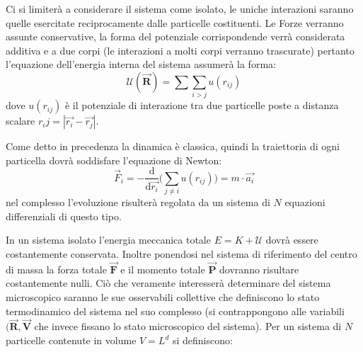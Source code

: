 \documentclass[11pt]{article}
\theoremstyle{plain}
\theoremstyle{remark}
\begin{document}
Ci si limiterà a considerare il sistema come isolato, le uniche interazioni saranno quelle esercitate reciprocamente dalle particelle costituenti. Le Forze verranno assunte conservative, la forma del potenziale corrispondende verrà considerata additiva e a due corpi (le interazioni a molti corpi verranno trascurate) pertanto l'equazione dell'energia interna del sistema assumerà la forma:
\begin{displaymath}
\mathcal{U}(\vec{\mathbf{R}}) = \sum\sum_{i>j}u(r_{ij})
\end{displaymath}
dove $u(r_{ij})$ è il potenziale di interazione tra due particelle poste a distanza scalare $r_ij = |\vec{r_i}-\vec{r_j}|$.


Come detto in precedenza la dinamica è classica, quindi la traiettoria di ogni particella dovrà soddisfare l'equazione di Newton:
\begin{displaymath}
\vec{F}_i = - \dfrac{\textrm{d}}{\textrm{d}\vec{r_i}} \Bigr(\sum_{j \neq i}u(r_{ij}) \Bigr) = m \cdot \vec{a_i}
\end{displaymath}
nel complesso l'evoluzione risulterà regolata da un sistema di $N$ equazioni differenziali di questo tipo.

In un sistema isolato l'energia meccanica totale $ E = K + \mathcal{U} $ dovrà essere costantemente conservata. Inoltre ponendosi nel sistema di riferimento del centro di massa la forza totale $\vec{\mathbf{F}}$ e il momento totale $\vec{\mathbf{P}}$ dovranno risultare costantemente nulli.
\medskip\newline
Ciò che veramente interesserà determinare del sistema microscopico saranno le sue osservabili collettive che definiscono lo stato termodinamico del sistema nel suo complesso (si contrappongono alle variabili $(\vec{\mathbf{R}},\vec{\mathbf{V}}$ che invece fissano lo stato microscopico del sistema). \newline
Per un sistema di $N$ particelle contenute in volume $V=L^d$ si definiscono:
\end{document}
